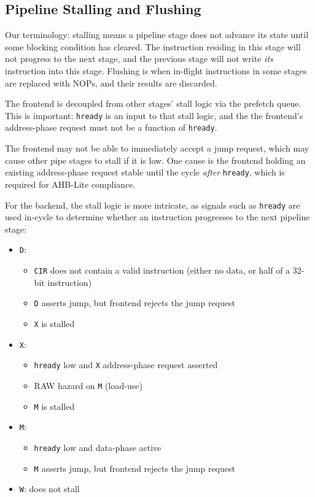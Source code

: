 \documentclass[notitlepage]{article}
\begin{document}
\subsection{Pipeline Stalling and Flushing}
\label{section:stalling_flushing}

Our terminology: stalling means a pipeline stage does not advance its state until some blocking condition has cleared. The instruction residing in this stage will not progress to the next stage, and the previous stage will not write {\it its} instruction into this stage. Flushing is when in-flight instructions in some stages are replaced with NOPs, and their results are discarded.

The frontend is decoupled from other stages' stall logic via the prefetch queue. This is important: {\tt hready} is an input to that stall logic, and the the frontend's address-phase request must not be a function of {\tt hready}.

The frontend may not be able to immediately accept a jump request, which may cause other pipe stages to stall if it is low. One cause is the frontend holding an existing address-phase request stable until the cycle {\it after} {\tt hready}, which is required for AHB-Lite compliance.

For the backend, the stall logic is more intricate, as signals such as {\tt hready} are used in-cycle to determine whether an instruction progresses to the next pipeline stage:

\begin{itemize}
	\item {\tt D}:
	\begin{itemize}
		\item {\tt CIR} does not contain a valid instruction (either no data, or half of a 32-bit instruction)
		\item {\tt D} asserts jump, but frontend rejects the jump request
		\item {\tt X} is stalled
	\end{itemize}
	\item {\tt X}:
	\begin{itemize}
		\item {\tt hready} low and {\tt X} address-phase request asserted
		\item RAW hazard on {\tt M} (load-use)
		\item {\tt M} is stalled
	\end{itemize}
	\item {\tt M}:
	\begin{itemize}
		\item {\tt hready} low and data-phase active
		\item {\tt M} asserts jump, but frontend rejects the jump request
	\end{itemize}
	\item {\tt W}: does not stall
\end{itemize}
\end{document}
